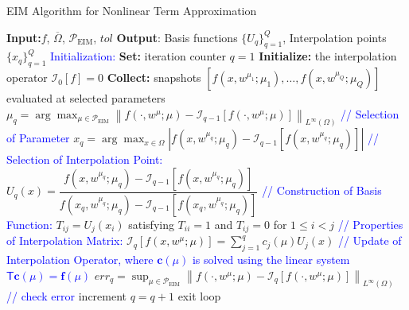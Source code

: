\documentclass[11pt]{article}
\renewcommand{\vec}[1]{\mathbf{#1}}
\newcommand{\mat}[1]{\mathsf{#1}}
\begin{document}
\begin{algorithm}
\caption{EIM Algorithm for Nonlinear Term Approximation}
\begin{algorithmic}[1]
\STATE \textbf{Input:}$f$, $\overline{\Omega}$, $\mathcal{P}_{\text{EIM}}$, $tol$
\STATE \textbf{Output}: Basis functions $\{ U_q \}_{q=1}^Q$, Interpolation points $\{ x_q \}_{q=1}^Q$
\STATE \textcolor{blue}{Initialization:}
\STATE \textbf{Set:} iteration counter $q = 1$
\STATE \textbf{Initialize:} the interpolation operator $\mathcal{I}_0[f] = 0$
\STATE \textbf{Collect:} snapshots $[f(x, w^{\mu_1}; \mu_1), \ldots, f(x, w^{\mu_Q}; \mu_Q)]$ evaluated at selected parameters
    \STATE $ \mu_q = \arg \max_{\mu \in \mathcal{P}_{\text{EIM}}} \left\| f(\cdot, w^\mu; \mu) - \mathcal{I}_{q-1}[ f(\cdot, w^\mu; \mu) ] \right\|_{L^\infty(\Omega)} $ \textcolor{blue}{// Selection of Parameter}\vspace{6pt}
    \STATE $ x_q = \arg \max_{x \in \Omega} \left| f(x, w^{\mu_q}; \mu_q) - \mathcal{I}_{q-1}[ f(x, w^{\mu_q}; \mu_q) ] \right| $ \textcolor{blue}{// Selection of Interpolation Point:}\vspace{6pt}
    \STATE $ U_q(x) = \dfrac{ f(x, w^{\mu_q}; \mu_q) - \mathcal{I}_{q-1}[ f(x, w^{\mu_q}; \mu_q) ] }{ f(x_q, w^{\mu_q}; \mu_q) - \mathcal{I}_{q-1}[ f(x_q, w^{\mu_q}; \mu_q) ] } $ \textcolor{blue}{// Construction of Basis Function:}\vspace{6pt}
    \STATE $T_{ij} = U_j(x_i)$ satisfying $T_{ii} = 1$ and $T_{ij} = 0$ for $1 \leq i < j$ \textcolor{blue}{// Properties of Interpolation Matrix:}\vspace{6pt}
    \STATE $   \mathcal{I}_q[ f(x, w^{\mu}; \mu) ] = \sum_{j=1}^q c_j(\mu) U_j(x) $ \textcolor{blue}{// Update of Interpolation Operator, where $\vec{c}(\mu)$ is solved using the linear system $\mat{T} \vec{c}(\mu) = \vec{f}(\mu)$}\vspace{6pt}
    \STATE $ err_q = \sup_{\mu \in \mathcal{P}_{\text{EIM}}} \left\| f(\cdot, w^\mu; \mu) - \mathcal{I}_q[ f(\cdot, w^\mu; \mu) ] \right\|_{L^\infty(\Omega)}$  \textcolor{blue}{// check error}\vspace{6pt}
        \STATE increment $q = q + 1$
    \ELSE
        \STATE exit loop
    \ENDIF
\ENDWHILE
\end{algorithmic}
\end{algorithm}
\end{document}
